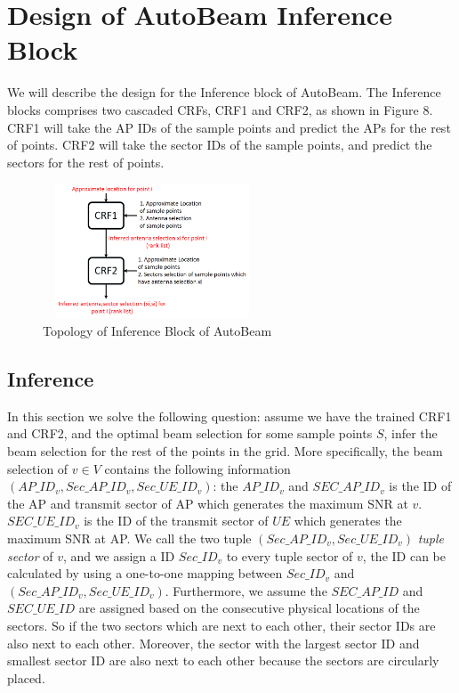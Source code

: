 \documentclass[conference]{IEEEtran}
\begin{document}
\section{Design of AutoBeam Inference Block}
We will describe the design for the Inference block of AutoBeam. The Inference blocks comprises two cascaded CRFs, CRF1 and CRF2, as shown in Figure 8. CRF1 will take the AP IDs of the sample points and predict the APs for the rest of points. CRF2 will take the sector IDs of the sample points, and predict the sectors for the rest of points. 
\begin{figure}
	\centerline{\includegraphics[width=6.5cm,height=4cm]{topology}}
	\caption[U-example]{Topology of Inference Block of AutoBeam}
\end{figure}
\subsection{Inference}
In this section we solve the following question: assume we have the trained CRF1 and CRF2, and the optimal beam selection for some sample points $S$, infer the beam selection for the rest of the points in the grid. More specifically, the beam selection of $v\in V$ contains the following information $(AP\_ID_{v}, Sec\_AP\_ID_{v}, Sec\_UE\_ID_{v})$: the $AP\_ID_{v}$ and $SEC\_AP\_ID_{v}$ is the ID of the AP and transmit sector of AP which generates the maximum SNR at $v$. $SEC\_UE\_ID_{v}$ is the ID of the transmit sector of $UE$ which generates the maximum SNR at AP. We call the two tuple $(Sec\_AP\_ID_{v}, Sec\_UE\_ID_{v})$ \emph{tuple sector} of $v$, and we assign a ID $Sec\_ID_{v}$ to every tuple sector of $v$, the ID can be calculated by using a one-to-one mapping between $Sec\_ID_{v}$ and $(Sec\_AP\_ID_{v}, Sec\_UE\_ID_{v})$. Furthermore, we assume the $SEC\_AP\_ID$ and $SEC\_UE\_ID$ are assigned based on the consecutive physical locations of the sectors. So if the two sectors which are next to each other, their sector IDs are also next to each other. Moreover, the sector with the largest sector ID and smallest sector ID are also next to each other because the sectors are circularly placed. 
 
\end{document}
